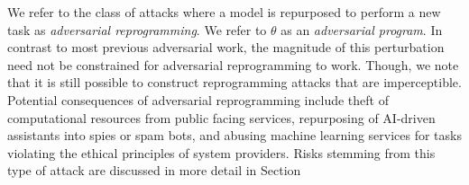 \documentclass{article}
\begin{document}
We refer to the class of attacks where a model is repurposed to
perform a new task as {\em adversarial reprogramming}.
We refer to $\theta$
as an {\em adversarial program}.
In contrast to most previous adversarial work, the magnitude of this perturbation need not be constrained for adversarial reprogramming to work. Though, we note that it is still possible to construct reprogramming attacks that are imperceptible.
Potential consequences of adversarial reprogramming include theft of computational resources from public facing services, repurposing of AI-driven assistants into spies or spam bots, and abusing machine learning services for tasks violating the ethical principles of system providers. 
Risks stemming from this type of attack are discussed in more detail in Section 
\end{document}
